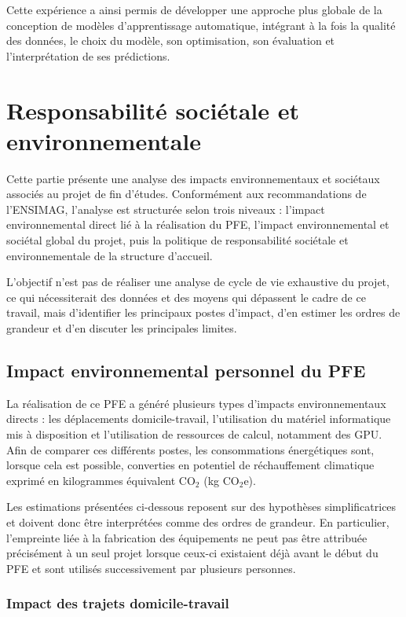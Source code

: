 \documentclass[12pt,a4paper,twoside]{article}
\begin{document}
Cette expérience a ainsi permis de développer une approche plus globale de la
conception de modèles d'apprentissage automatique, intégrant à la fois la
qualité des données, le choix du modèle, son optimisation, son évaluation et
l'interprétation de ses prédictions.

\section{Responsabilité sociétale et environnementale}
\label{sec:rse}

Cette partie présente une analyse des impacts environnementaux et sociétaux associés au projet de fin d'études. Conformément aux recommandations de l'ENSIMAG, l'analyse est structurée selon trois niveaux : l'impact environnemental direct lié à la réalisation du PFE, l'impact environnemental et sociétal global du projet, puis la politique de responsabilité sociétale et environnementale de la structure d'accueil.

L'objectif n'est pas de réaliser une analyse de cycle de vie exhaustive du projet, ce qui nécessiterait des données et des moyens qui dépassent le cadre de ce travail, mais d'identifier les principaux postes d'impact, d'en estimer les ordres de grandeur et d'en discuter les principales limites.

\subsection{Impact environnemental personnel du PFE}
\label{subsec:rse_impact_personnel}

La réalisation de ce PFE a généré plusieurs types d'impacts environnementaux directs : les déplacements domicile-travail, l'utilisation du matériel informatique mis à disposition et l'utilisation de ressources de calcul, notamment des GPU. Afin de comparer ces différents postes, les consommations énergétiques sont, lorsque cela est possible, converties en potentiel de réchauffement climatique exprimé en kilogrammes équivalent CO$_2$ (kg CO$_2$e).

Les estimations présentées ci-dessous reposent sur des hypothèses simplificatrices et doivent donc être interprétées comme des ordres de grandeur. En particulier, l'empreinte liée à la fabrication des équipements ne peut pas être attribuée précisément à un seul projet lorsque ceux-ci existaient déjà avant le début du PFE et sont utilisés successivement par plusieurs personnes.

\subsubsection{Impact des trajets domicile-travail}
\label{subsubsec:rse_transport}
\end{document}
